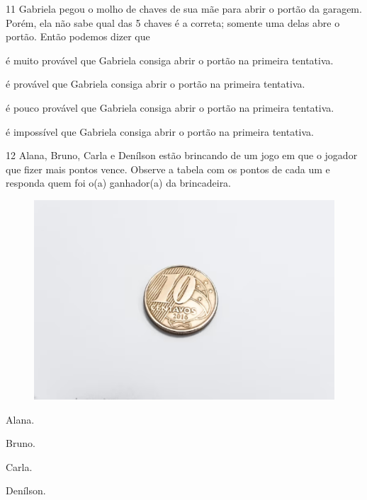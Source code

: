 \num{11} Gabriela pegou o molho de chaves de sua mãe para abrir o portão da
garagem. Porém, ela não sabe qual das 5 chaves é a correta; somente uma
delas abre o portão. Então podemos dizer que

\begin{escolha}
\item é muito provável que Gabriela consiga abrir o portão na primeira tentativa.

\item é provável que Gabriela consiga abrir o portão na primeira tentativa.

\item é pouco provável que Gabriela consiga abrir o portão na primeira tentativa.

\item é impossível que Gabriela consiga abrir o portão na primeira tentativa.
\end{escolha}



\pagebreak
\num{12} Alana, Bruno, Carla e Denílson estão brincando de um jogo em que o
jogador que fizer mais pontos vence. Observe a tabela com os pontos de
cada um e responda quem foi o(a) ganhador(a) da brincadeira.

\begin{figure}[htpb!]
\centering
\includegraphics[width=.5\textwidth]{./media/image121.png}
\end{figure}

\begin{minipage}{.5\textwidth}
\begin{escolha}
\item Alana.

\item Bruno.

\item Carla.

\item Denílson.
\end{escolha}
\end{minipage}

